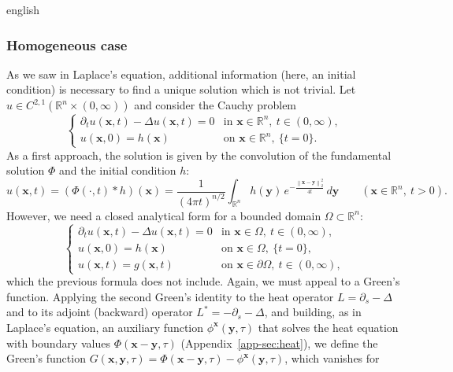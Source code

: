 \documentclass[11pt,letterpaper,twoside,openright]{book} %
\newcommand{\norm}[1]{\left\lVert #1 \right\rVert}
\begin{document}
\begin{hyphenrules}{english}
\subsubsection{Homogeneous case}
As we saw in Laplace's equation, additional information (here, an initial condition) is necessary to
find a unique solution which is not trivial. Let $u\in C^{2,1}(\mathbb{R}^n\times(0,\infty))$ and consider the
Cauchy problem
\begin{equation}
  \begin{cases}
    \partial_t u(\mathbf{x},t)-\Delta u(\mathbf{x},t)=0 & \text{in } \mathbf{x}\in\mathbb{R}^n,\ t\in(0,\infty),\\
    u(\mathbf{x},0)=h(\mathbf{x}) & \text{on } \mathbf{x}\in\mathbb{R}^n,\ \{t=0\}.
  \end{cases}
  \label{eq:heat-cauchy}
\end{equation}
As a first approach, the solution is given by the convolution of the fundamental solution $\Phi$ and
the initial condition $h$:
\begin{equation}
  u(\mathbf{x},t)=(\Phi(\cdot,t)*h)(\mathbf{x})=\frac{1}{(4\pi t)^{n/2}}\int_{\mathbb{R}^n}h(\mathbf{y})\,
  e^{-\frac{\norm{\mathbf{x}-\mathbf{y}}_2^2}{4t}}\,d\mathbf{y}\qquad(\mathbf{x}\in\mathbb{R}^n,\ t>0).
  \label{eq:heat-convolution}
\end{equation}
However, we need a closed analytical form for a bounded domain $\Omega\subset\mathbb{R}^n$:
\begin{equation}
  \begin{cases}
    \partial_t u(\mathbf{x},t)-\Delta u(\mathbf{x},t)=0 & \text{in } \mathbf{x}\in\Omega,\ t\in(0,\infty),\\
    u(\mathbf{x},0)=h(\mathbf{x}) & \text{on } \mathbf{x}\in\Omega,\ \{t=0\},\\
    u(\mathbf{x},t)=g(\mathbf{x},t) & \text{on } \mathbf{x}\in\partial\Omega,\ t\in(0,\infty),
  \end{cases}
  \label{eq:heat-ibvp}
\end{equation}
which the previous formula does not include. Again, we must appeal to a Green's function. Applying the
second Green's identity to the heat operator $L=\partial_s-\Delta$ and to its adjoint (backward) operator
$L^{*}=-\partial_s-\Delta$, and building, as in Laplace's equation, an auxiliary function
$\phi^{\mathbf{x}}(\mathbf{y},\tau)$ that solves the heat equation with boundary values
$\Phi(\mathbf{x}-\mathbf{y},\tau)$ (Appendix~\ref{app-sec:heat}), we define the Green's function
$G(\mathbf{x},\mathbf{y},\tau)=\Phi(\mathbf{x}-\mathbf{y},\tau)-\phi^{\mathbf{x}}(\mathbf{y},\tau)$, which vanishes for

\end{hyphenrules}
\end{document}
